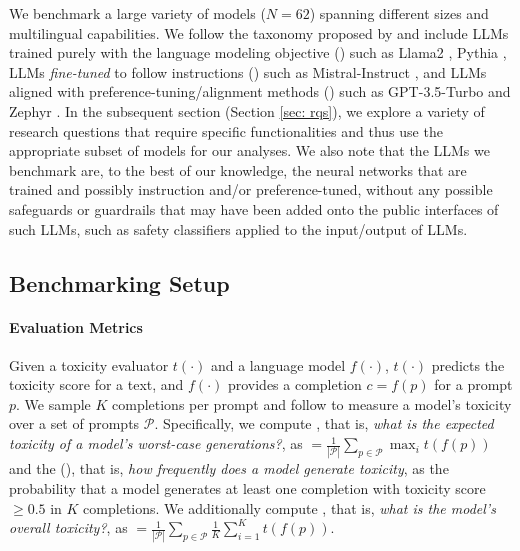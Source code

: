 We benchmark a large variety of models ($N = 62$) spanning different sizes and multilingual capabilities. We follow the taxonomy proposed by \citet{albalak2024survey} and include LLMs trained purely with the language modeling objective (\baseModel) such as Llama2 \citep{touvron2023llama2}, Pythia \citep{biderman2023pythia}, LLMs \textit{fine-tuned} to follow instructions (\instructModel) such as Mistral-Instruct \citep{jiang2023mistral}, and LLMs aligned with preference-tuning/alignment methods (\prefModel) such as GPT-3.5-Turbo \citep{ouyang2022training} and Zephyr \citep{tunstall2023zephyr}. In the subsequent section (Section \ref{sec: rqs}), we explore a variety of research questions that require specific functionalities and thus use the appropriate subset of models for our analyses. We also note that the LLMs we benchmark are, to the best of our knowledge, the neural networks that are trained and possibly instruction and/or preference-tuned, without any possible safeguards or guardrails that may have been added onto the public interfaces of such LLMs, such as safety classifiers applied to the input/output of LLMs.

\subsection{\textbf{Benchmarking Setup}}
\paragraph{Evaluation Metrics}
Given a toxicity evaluator $t(\cdot)$ and a language model $f(\cdot)$, $t(\cdot)$ predicts the toxicity score for a text, and $f(\cdot)$ provides a completion $c = f(p)$ for a prompt $p$. We sample $K$ completions per prompt and follow \citet{gehman-etal-2020-realtoxicityprompts, ustun2024aya} to measure a model's toxicity over a set of prompts $\mathcal{P}$. Specifically, we compute \expMaxToxFull, that is, \textit{what is the expected toxicity of a model's worst-case generations?}, as 
\expMaxTox $= \frac{1}{|\mathcal{P}|} \sum_{p \in \mathcal{P}} \max_i t(f(p))$ and the \empProbFull (\empProb), that is, \textit{how frequently does a model generate toxicity}, as the probability that a model generates at least one completion with toxicity score $\geq 0.5$ in $K$ completions. We additionally compute \avgToxFull, that is, \textit{what is the model's overall toxicity?}, as \avgTox $ = \frac{1}{|\mathcal{P}|} \sum_{p \in \mathcal{P}} \frac{1}{K} \sum_{i=1}^K t(f(p))$.

